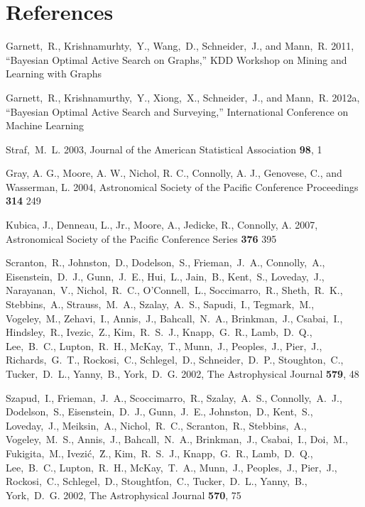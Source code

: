 \documentclass[prd,nofootbib,floatfix,11pt,tightenlines,nofootinbib]{revtex4}
\begin{document}
\newpage


\section*{References}
\begin{thebibliography}{99}

Garnett,~R., Krishnamurhty,~Y., Wang,~D., Schneider,~J., and Mann,~R. 2011,
``Bayesian Optimal Active Search on Graphs,'' KDD Workshop on Mining and
Learning with Graphs

Garnett,~R., Krishnamurthy,~Y., Xiong,~X., Schneider,~J., and Mann,~R. 2012a,
``Bayesian Optimal Active Search and Surveying,'' International Conference on
Machine Learning

Straf,~M.~L. 2003, Journal of the American Statistical Association {\bf 98}, 1

Gray, A. G., Moore, A. W., Nichol, R. C., Connolly, A. J.,
Genovese, C., and Wasserman, L. 2004, Astronomical Society of the Pacific Conference
Proceedings {\bf 314} 249

Kubica, J., Denneau, L., Jr., Moore, A., Jedicke, R., Connolly, A. 2007,
Astronomical Society of the Pacific Conference Series {\bf 376} 395

Scranton,~R., Johnston,~D., Dodelson,~S., Frieman,~J.~A., Connolly,~A.,
Eisenstein,~D.~J., Gunn,~J.~E., Hui,~L., Jain,~B., Kent,~S., Loveday,~J.,
Narayanan,~V., Nichol,~R.~C., O'Connell,~L., Soccimarro,~R., Sheth,~R.~K.,
Stebbins,~A., Strauss,~M.~A., Szalay,~A.~S., Sapudi,~I., Tegmark,~M.,
Vogeley,~M., Zehavi,~I., Annis,~J., Bahcall,~N.~A., Brinkman,~J., Csabai,~I.,
Hindsley,~R., Ivezic,~Z., Kim,~R.~S.~J., Knapp,~G.~R., Lamb,~D.~Q., Lee,~B.~C.,
Lupton,~R.~H., McKay,~T., Munn,~J., Peoples,~J., Pier,~J., Richards,~G.~T.,
Rockosi,~C., Schlegel,~D., Schneider,~D.~P., Stoughton,~C., Tucker,~D.~L.,
Yanny,~B., York,~D.~G. 2002, The Astrophysical Journal {\bf 579}, 48

Szapud,~I., Frieman,~J.~A., Scoccimarro,~R., Szalay,~A.~S., Connolly,~A.~J.,
Dodelson,~S., Eisenstein,~D.~J., Gunn,~J.~E., Johnston,~D., Kent,~S.,
Loveday,~J., Meiksin,~A., Nichol,~R.~C., Scranton,~R., Stebbins,~A.,
Vogeley,~M.~S., Annis,~J., Bahcall,~N.~A., Brinkman,~J., Csabai,~I., Doi,~M.,
Fukigita,~M., Ivezi\'c,~\u Z., Kim,~R.~S.~J., Knapp,~G.~R., Lamb,~D.~Q.,
Lee,~B.~C., Lupton,~R.~H., McKay,~T.~A., Munn,~J., Peoples,~J., Pier,~J.,
Rockosi,~C., Schlegel,~D., Stoughtfon,~C., Tucker,~D.~L., Yanny,~B., York,~D.~G.
2002, The Astrophysical Journal {\bf 570}, 75


\end{thebibliography}
\end{document}
